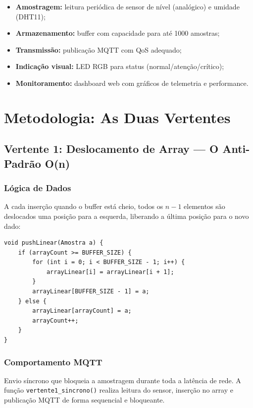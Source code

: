 \documentclass[12pt, a4paper]{article}
\begin{document}
\begin{itemize}
    \item \textbf{Amostragem:} leitura periódica de sensor de nível (analógico) e umidade (DHT11);
    \item \textbf{Armazenamento:} buffer com capacidade para até 1000 amostras;
    \item \textbf{Transmissão:} publicação MQTT com QoS adequado;
    \item \textbf{Indicação visual:} LED RGB para status (normal/atenção/crítico);
    \item \textbf{Monitoramento:} dashboard web com gráficos de telemetria e performance.
\end{itemize}

\section{Metodologia: As Duas Vertentes}

\subsection{Vertente 1: Deslocamento de Array --- O Anti-Padrão O(n)}

\subsubsection{Lógica de Dados}

A cada inserção quando o buffer está cheio, todos os $n-1$ elementos são deslocados uma posição para a esquerda, liberando a última posição para o novo dado:

\begin{lstlisting}[caption={Inserção com deslocamento linear}]
void pushLinear(Amostra a) {
    if (arrayCount >= BUFFER_SIZE) {
        for (int i = 0; i < BUFFER_SIZE - 1; i++) {
            arrayLinear[i] = arrayLinear[i + 1];
        }
        arrayLinear[BUFFER_SIZE - 1] = a;
    } else {
        arrayLinear[arrayCount] = a;
        arrayCount++;
    }
}
\end{lstlisting}

\subsubsection{Comportamento MQTT}

Envio síncrono que bloqueia a amostragem durante toda a latência de rede. A função \texttt{vertente1\_sincrono()} realiza leitura do sensor, inserção no array e publicação MQTT de forma sequencial e bloqueante.
\end{document}
